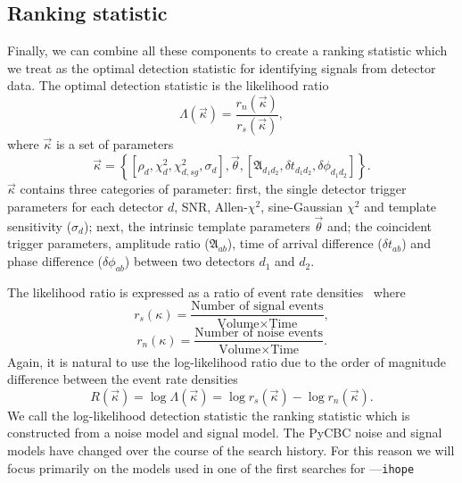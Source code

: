 \subsection{\label{2:sec:ranking-statistic}Ranking statistic}

Finally, we can combine all these components to create a ranking statistic which we treat as the optimal detection statistic for identifying \gwadj signals from \gwadj detector data. The optimal detection statistic is the likelihood ratio~\cite{Biswas:2012}
%
\begin{equation}
    \Lambda(\vec{\kappa}) = \frac{r_{n}(\vec{\kappa})}{r_{s}(\vec{\kappa})},
\end{equation}
%
where $\vec{\kappa}$ is a set of parameters
%
\begin{equation}
    \vec{\kappa} = \left\{ \left[\rho_{d}, \chi^{2}_{d}, \chi^{2}_{d, sg}, \sigma_{d}\right], \vec{\theta}, \left[\mathfrak{A}_{d_{1}d_{2}}, \delta t_{d_{1}d_{2}}, \delta\phi_{d_{1}d_{2}}\right] \right\}.
\end{equation}
%
$\vec{\kappa}$ contains three categories of parameter: first, the single detector trigger parameters for each detector $d$, SNR, Allen-$\chi^{2}$, sine-Gaussian $\chi^{2}$ and template sensitivity ($\sigma_{d}$); next, the intrinsic template parameters $\vec{\theta}$ and; the coincident trigger parameters, amplitude ratio ($\mathfrak{A}_{ab}$), time of arrival difference ($\delta t_{ab}$) and phase difference ($\delta \phi_{ab}$) between two detectors $d_{1}$ and $d_{2}$.

The likelihood ratio is expressed as a ratio of event rate densities~\cite{PyCBC_global:2020} where
%
\begin{equation}
    r_{s}(\kappa) = \frac{\text{Number of signal events}}{\text{Volume} \times \text{Time}},
\end{equation}
%
\begin{equation}
    r_{n}(\kappa) = \frac{\text{Number of noise events}}{\text{Volume} \times \text{Time}}.
\end{equation}
%
Again, it is natural to use the log-likelihood ratio due to the order of magnitude difference between the event rate densities
%
\begin{equation}
    R(\vec{\kappa}) = \log \Lambda(\vec{\kappa}) = \log r_{s}(\vec{\kappa}) - \log r_{n}(\vec{\kappa}).
\end{equation}
%
We call the log-likelihood detection statistic the ranking statistic which is constructed from a noise model and signal model. The PyCBC noise and signal models have changed over the course of the \gwadj search history. For this reason we will focus primarily on the models used in one of the first searches for \cbcs---\verb|ihope|~\cite{IHOPE:2012zx}

